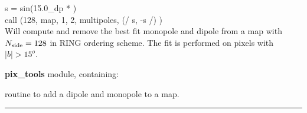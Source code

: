 \newpage
\begin{example}
{
s = sin(15.0\_dp * ) \\
call \thedocid (128, map, 1, 2, multipoles, (/ s, -s /) )  \\
}
{
Will compute and remove the best fit monopole and dipole from a map with
$N_{\mathrm{side}}=128$ in RING ordering scheme. The fit is performed on pixels with $|b|>15^o$.
}
\end{example}

\begin{modules}
  \begin{sulist}{} %
  \item[\textbf{pix\_tools}] module, containing:
  \end{sulist}
\end{modules}

\begin{related}
  \begin{sulist}{} %
  \item[\htmlref{add\_dipole}{sub:add_dipole}] routine to add a dipole and
  monopole to a map.
  \end{sulist}
\end{related}

\rule{\hsize}{2mm}

\newpage
